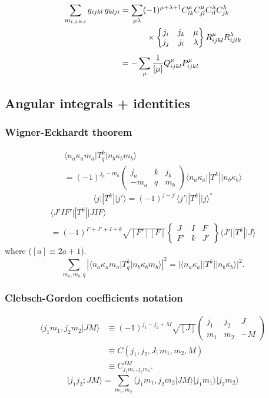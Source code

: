 \documentclass[10pt,twocolumn,a4paper]{article}%
\newcommand{\bra}[1]{\ensuremath{\langle #1|}}	%
\newcommand{\ket}[1]{\ensuremath{|#1\rangle}}	%
\newcommand{\braket}[1]{\ensuremath{\langle #1\rangle}}	%
\newcommand{\threej}[6]{\ensuremath{\begin{pmatrix}#1&#2&#3\\#4&#5&#6\end{pmatrix}}}	%
\newcommand{\sixj}[6]{\ensuremath{\begin{Bmatrix}#1&#2&#3\\#4&#5&#6\end{Bmatrix}}}	%
\newcommand{\be}{\begin{equation}}
\newcommand{\ee}{\end{equation}}
\renewcommand{\k}{\ensuremath{\kappa}}
\begin{document}
\begin{align}
\sum_{m_{i,j,k,l}}  g_{ijkl} \, g_{klji}
    &=\sum_{\mu \lambda}(-1)^{\mu+\lambda+1}C^\mu_{ik}C^\mu_{jl}C^\lambda_{il}C^\lambda_{jk} \notag \\
    &\phantom{=\sum_{\mu \lambda}}~~\times \sixj{j_i}{j_k}{\mu}{j_j}{j_l}{\lambda}R^\mu_{ijkl}R^\lambda_{ijlk} \\
    &=-\sum_\mu \frac{1}{[\mu]}  Q^\mu_{ijkl}P^\mu_{ijkl}
\end{align}



\subsection{Angular integrals + identities}


\subsubsection*{Wigner-Eckhardt theorem}
\begin{multline}
\bra{n_a \k_a m_a}T^k_q\ket{n_b \k_b m_b} \\= (-1)^{j_a-m_a}\threej{j_a}{k}{j_b}{-m_a}{q}{m_b} \bra{n_a \k_a}|T^k|\ket{n_b \k_b}
\end{multline}
\be
\bra{j}|T^k|\ket{j'} = (-1)^{j-j'}\bra{j'}|T^k|\ket{j}^*
\ee
%
\begin{multline}
\bra{J'IF'}|T^k|\ket{JIF} \\= (-1)^{F+J'+I+k}\sqrt{[F'][F]}\sixj{J}{I}{F}{F'}{k}{J'}\bra{J'}|T^k|\ket{J}
\end{multline}
where ($[a]\equiv2a+1$).
%
\be
\sum_{m_a,m_b,q} |\bra{n_a \k_a m_a}T^k_q\ket{n_b \k_b m_b}|^2 = |\bra{n_a \k_a}|T^k|\ket{n_b \k_b}|^2.
\ee







\subsubsection*{Clebsch-Gordon coefficients notation}

\begin{align}
\braket{j_1 m_1,j_2m_2|JM} &\equiv (-1)^{j_1-j_2+M}\sqrt{[J]}\threej{j_1}{j_2}{J}{m_1}{m_2}{-M}\\
&\equiv C(j_1,j_2,J; m_1, m_2, M)\\
&\equiv C^{JM}_{j_1m_1,j_2m_2}.
\end{align}
\be
\ket{j_1 j_2;JM} =\sum_{m_1,m_2} \braket{j_1 m_1,j_2m_2|JM} \ket{j_1m_1}\ket{j_2m_2}
\ee
\end{document}
